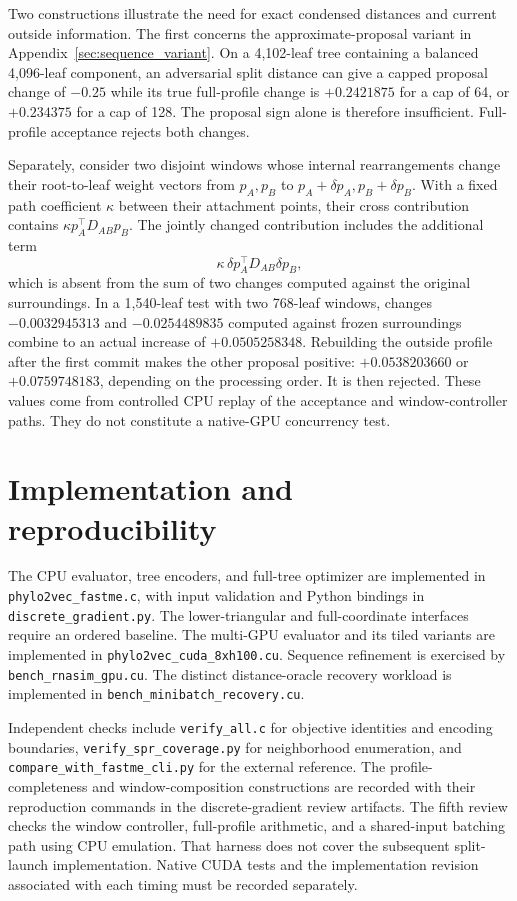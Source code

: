 Two constructions illustrate the need for exact condensed distances and current outside information.
The first concerns the approximate-proposal variant in Appendix~\ref{sec:sequence_variant}.
On a 4,102-leaf tree containing a balanced 4,096-leaf component, an adversarial split distance can give a capped proposal change of $-0.25$ while its true full-profile change is $+0.2421875$ for a cap of 64, or $+0.234375$ for a cap of 128.
The proposal sign alone is therefore insufficient.
Full-profile acceptance rejects both changes.

Separately, consider two disjoint windows whose internal rearrangements change their root-to-leaf weight vectors from $p_A,p_B$ to $p_A+\delta p_A,p_B+\delta p_B$.
With a fixed path coefficient $\kappa$ between their attachment points, their cross contribution contains
$\kappa p_A^\top D_{AB}p_B$.
The jointly changed contribution includes the additional term
\[
 \kappa\,\delta p_A^\top D_{AB}\delta p_B,
\]
which is absent from the sum of two changes computed against the original surroundings.
In a 1,540-leaf test with two 768-leaf windows, changes
$-0.0032945313$ and $-0.0254489835$ computed against frozen surroundings combine to an actual increase of $+0.0505258348$.
Rebuilding the outside profile after the first commit makes the other proposal positive:
$+0.0538203660$ or $+0.0759748183$, depending on the processing order.
It is then rejected.
These values come from controlled CPU replay of the acceptance and window-controller paths.
They do not constitute a native-GPU concurrency test.

\section{Implementation and reproducibility}
\label{sec:software}

The CPU evaluator, tree encoders, and full-tree optimizer are implemented in
\texttt{phylo2vec\_fastme.c}, with input validation and Python bindings in
\texttt{discrete\_gradient.py}.
The lower-triangular and full-coordinate interfaces require an ordered baseline.
The multi-GPU evaluator and its tiled variants are implemented in
\texttt{phylo2vec\_cuda\_8xh100.cu}.
Sequence refinement is exercised by \texttt{bench\_rnasim\_gpu.cu}.
The distinct distance-oracle recovery workload is implemented in
\texttt{bench\_minibatch\_recovery.cu}.

Independent checks include \texttt{verify\_all.c} for objective identities and encoding boundaries,
\texttt{verify\_spr\_coverage.py} for neighborhood enumeration, and
\texttt{compare\_with\_fastme\_cli.py} for the external reference.
The profile-completeness and window-composition constructions are recorded with their reproduction commands in the discrete-gradient review artifacts.
The fifth review checks the window controller, full-profile arithmetic, and a shared-input batching path using CPU emulation.
That harness does not cover the subsequent split-launch implementation.
Native CUDA tests and the implementation revision associated with each timing must be recorded separately.

